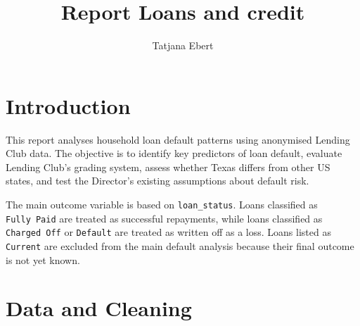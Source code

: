 \documentclass[11pt,preprint]{elsarticle}
\numberwithin{equation}{section}
\numberwithin{figure}{section}
\numberwithin{table}{section}
\begin{document}
\begin{frontmatter}  %

\title{Report Loans and credit}





\author[Add1]{Tatjana Ebert}
\ead{}








\vspace{1cm}





\vspace{0.5cm}

\end{frontmatter}

\setcounter{footnote}{0}



\pagestyle{fancy}
\chead{}
\rhead{}
\lfoot{}
\lhead{}
\cfoot{}


\headsep 35pt %




\section{Introduction}\label{introduction}

This report analyses household loan default patterns using anonymised
Lending Club data. The objective is to identify key predictors of loan
default, evaluate Lending Club's grading system, assess whether Texas
differs from other US states, and test the Director's existing
assumptions about default risk.

The main outcome variable is based on \texttt{loan\_status}. Loans
classified as \texttt{Fully\ Paid} are treated as successful repayments,
while loans classified as \texttt{Charged\ Off} or \texttt{Default} are
treated as written off as a loss. Loans listed as \texttt{Current} are
excluded from the main default analysis because their final outcome is
not yet known.

\section{Data and Cleaning}\label{data-and-cleaning}
\end{document}
